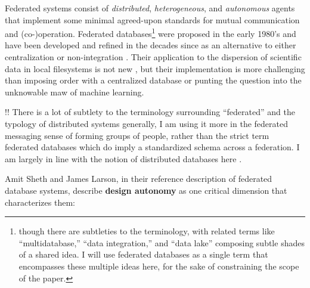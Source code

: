\documentclass[10pt]{tufte-book}
\begin{document}
Federated systems consist of \emph{distributed}, \emph{heterogeneous},
and \emph{autonomous} agents that implement some minimal agreed-upon
standards for mutual communication and (co-)operation. Federated
databases\footnote{though there are subtleties to the terminology, with
  related terms like ``multidatabase,'' ``data integration,'' and ``data
  lake'' composing subtle shades of a shared idea. I will use federated
  databases as a single term that encompasses these multiple ideas here,
  for the sake of constraining the scope of the paper.} were proposed in
the early 1980's \citep{heimbignerFederatedArchitectureInformation1985}  and have been
developed and refined in the decades since as an alternative to either
centralization or non-integration \citep{litwinInteroperabilityMultipleAutonomous1990, kashyapSemanticSchematicSimilarities1996, hullManagingSemanticHeterogeneity1997} . Their application to the
dispersion of scientific data in local filesystems is not new \citep{busseFederatedInformationSystems1999, djokic-petrovicPIBASFedSPARQLWebbased2017, hasnainBioFedFederatedQuery2017} , but their implementation is more
challenging than imposing order with a centralized database or punting
the question into the unknowable maw of machine learning.

!! There is a lot of subtlety to the terminology surrounding
``federated'' and the typology of distributed systems generally, I am
using it more in the federated messaging sense of forming groups of
people, rather than the strict term federated databases which do imply a
standardized schema across a federation. I am largely in line with the
notion of distributed databases here \citep{hankeDefenseDecentralizedResearch2021} .

Amit Sheth and James Larson, in their reference description of federated
database systems, describe \textbf{design autonomy} as one critical
dimension that characterizes them:
\end{document}
